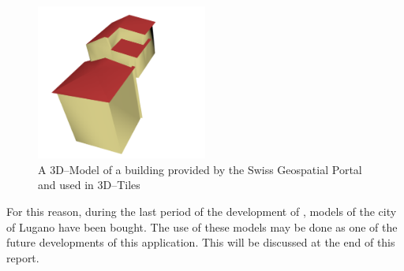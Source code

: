 \begin{figure} [H]
\centering
\includegraphics[width=0.5\textwidth]{chapter2/images/swisstopoBuildingModel}
\caption{A 3D--Model of a building provided by the Swiss Geospatial Portal and used in 3D--Tiles}
\label{fig:swisstopoBuildingModel}
\end{figure}
For this reason, during the last period of the development of \applicationName, models of the city of Lugano have been bought. The use of these models may be done as one of the future developments of this application. This will be discussed at the end of this report.